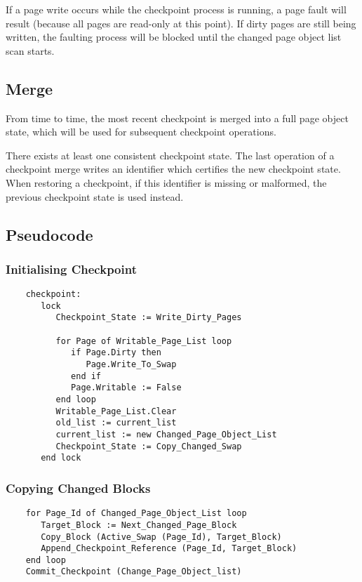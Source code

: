 If a page write occurs while the checkpoint process is running, a page fault will result (because all pages are read-only at this point).  If dirty pages are still being written, the faulting process will be blocked until the changed page object list scan starts.

\subsection{Merge}

From time to time, the most recent checkpoint is merged into a full page object state, which will be used for subsequent checkpoint operations.

There exists at least one consistent checkpoint state.  The last operation of a checkpoint merge writes an identifier which certifies the new checkpoint state.  When restoring a checkpoint, if this identifier is missing or malformed, the previous checkpoint state is used instead.

\subsection{Pseudocode}

\subsubsection{Initialising Checkpoint}

\begin{verbatim}
    checkpoint:
       lock
          Checkpoint_State := Write_Dirty_Pages
          
          for Page of Writable_Page_List loop
             if Page.Dirty then
                Page.Write_To_Swap
             end if
             Page.Writable := False
          end loop
          Writable_Page_List.Clear
          old_list := current_list
          current_list := new Changed_Page_Object_List
          Checkpoint_State := Copy_Changed_Swap
       end lock
\end{verbatim}

\subsubsection{Copying Changed Blocks}

\begin{verbatim}
    for Page_Id of Changed_Page_Object_List loop
       Target_Block := Next_Changed_Page_Block
       Copy_Block (Active_Swap (Page_Id), Target_Block)
       Append_Checkpoint_Reference (Page_Id, Target_Block)
    end loop
    Commit_Checkpoint (Change_Page_Object_list)
\end{verbatim}

